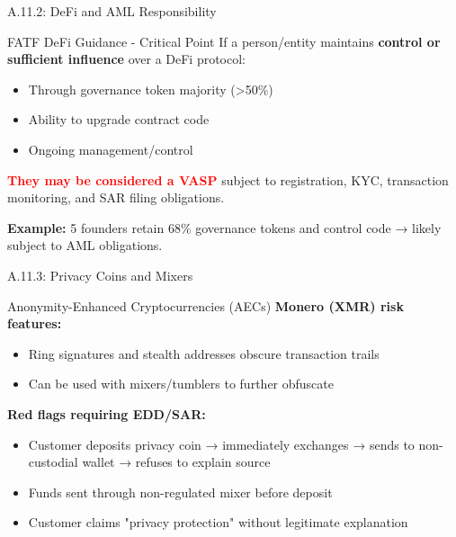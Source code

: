 \documentclass{beamer}
\begin{document}
	\begin{frame}{A.11.2: DeFi and AML Responsibility}
		\begin{block}{FATF DeFi Guidance - Critical Point}
			If a person/entity maintains \textbf{control or sufficient influence} over a DeFi protocol:
			\begin{itemize}
				\item Through governance token majority (>50\%) 
				\item Ability to upgrade contract code
				\item Ongoing management/control
			\end{itemize}
			\vspace{0.2cm}
			\textcolor{red}{\textbf{They may be considered a VASP}} subject to registration, KYC, transaction monitoring, and SAR filing obligations.
		\end{block}
		\textbf{Example:} 5 founders retain 68\% governance tokens and control code → likely subject to AML obligations.
	\end{frame}
	
	\begin{frame}{A.11.3: Privacy Coins and Mixers}
		\begin{block}{Anonymity-Enhanced Cryptocurrencies (AECs)}
			\textbf{Monero (XMR) risk features:}
			\begin{itemize}
				\item Ring signatures and stealth addresses obscure transaction trails
				\item Can be used with mixers/tumblers to further obfuscate
			\end{itemize}
		\end{block}
		\textbf{Red flags requiring EDD/SAR:}
		\begin{itemize}
			\item Customer deposits privacy coin → immediately exchanges → sends to non-custodial wallet → refuses to explain source
			\item Funds sent through non-regulated mixer before deposit
			\item Customer claims "privacy protection" without legitimate explanation
		\end{itemize}
	\end{frame}
	
\end{document}
